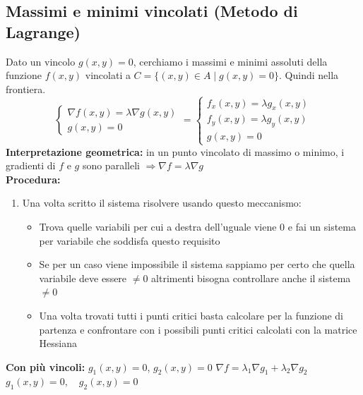 \documentclass[10pt, a4paper]{article}
\begin{document}
    \subsection{Massimi e minimi vincolati (Metodo di Lagrange)}
        Dato un vincolo $g(x, y) = 0 $, cerchiamo i massimi e minimi assoluti della funzione $f(x, y)$ vincolati a $C = \{(x, y) \in A \mid g(x, y) = 0\}$. Quindi nella frontiera.
        \begin{equation*}
            \begin{cases}
                \nabla f(x, y) = \lambda \nabla g(x, y) \\
                g(x, y) = 0
            \end{cases} = \begin{cases}
                f_x(x,y) = \lambda g_x(x,y)\\
                f_y(x,y) = \lambda g_y(x,y)\\
                g(x,y) = 0
            \end{cases}
        \end{equation*}
        \textbf{Interpretazione geometrica:} in un punto vincolato di massimo o minimo, i gradienti di $f$ e $g$ sono paralleli $\Rightarrow \nabla f = \lambda \nabla g$
        \\\textbf{Procedura:}
        \begin{enumerate}
            \item Una volta scritto il sistema risolvere usando questo meccanismo: \begin{itemize}
                \item Trova quelle variabili per cui a destra dell'uguale viene 0 e fai un sistema per variabile che soddisfa questo requisito
                \item Se per un caso viene impossibile il sistema sappiamo per certo che quella variabile deve essere $\neq 0$ altrimenti bisogna controllare anche il sistema $\neq 0$
                \item Una volta trovati tutti i punti critici basta calcolare per la funzione di partenza e confrontare con i possibili punti critici calcolati con la matrice Hessiana
            \end{itemize}
        \end{enumerate}
    \textbf{Con più vincoli: } $g_1(x, y) = 0$, $g_2(x, y) = 0$
    $\nabla f = \lambda_1 \nabla g_1 + \lambda_2 \nabla g_2$
    $g_1(x, y) = 0, \quad g_2(x, y) = 0$
\end{document}
